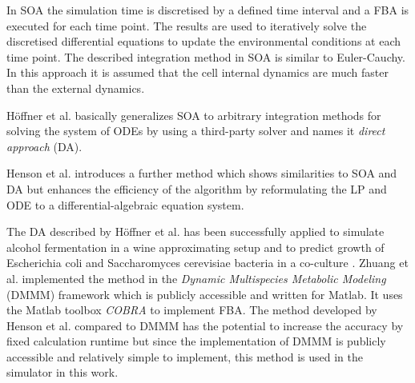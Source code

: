 In SOA the simulation time is discretised by a defined time interval and a FBA is executed for
each time point. The results are used to iteratively solve the discretised differential equations
to update the environmental conditions at each time point. The described integration method in SOA
is similar to Euler-Cauchy.
In this approach it is assumed that the cell internal dynamics are much faster than the external dynamics.

Höffner et al. basically generalizes SOA to arbitrary integration methods for solving the system of ODEs
by using a third-party solver and names it \textit{direct approach} (DA)\cite{hoffner_reliable_2013}.

Henson et al. introduces a further method which shows similarities to SOA and DA but enhances the efficiency of the
algorithm\cite{hoffner_reliable_2013} by reformulating the LP and ODE to a 
differential-algebraic equation system\cite{henson_dynamic_2014}.

The DA described by Höffner et al. has been successfully applied to simulate alcohol fermentation
in a wine approximating setup \cite{sainz_modeling_2003} \cite{pizarro_coupling_2007} and to
predict growth of Escherichia coli and Saccharomyces cerevisiae bacteria in a co-culture
\cite{hanly_dynamic_2011}. Zhuang et al. implemented
the method in the \textit{Dynamic Multispecies Metabolic Modeling} (DMMM) framework
which is publicly accessible and written for Matlab\cite{zhuang_design_2012}. It uses the Matlab
toolbox \textit{COBRA}\cite{heirendt_creation_nodate} to implement FBA.
The method developed by Henson et al. compared to DMMM has the potential to increase the accuracy
by fixed calculation runtime but since the implementation of DMMM is publicly accessible and
relatively simple to implement, this method is used in the simulator in this work.


